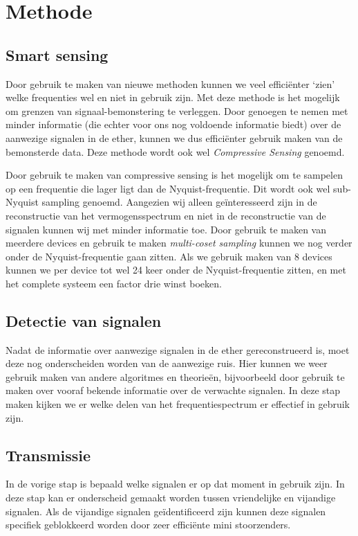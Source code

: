 \documentclass[oneside, a4paper, openany]{memoir}
\begin{document}
\section{Methode}
\subsection{Smart sensing}
Door gebruik te maken van nieuwe methoden kunnen we veel efficiënter `zien' welke frequenties wel en niet in gebruik zijn. Met deze methode is het mogelijk om grenzen van signaal-bemonstering te verleggen. Door genoegen te nemen met minder informatie (die echter voor ons nog voldoende informatie biedt) over de aanwezige signalen in de ether, kunnen we dus efficiënter gebruik maken van de bemonsterde data. Deze methode wordt ook wel \textit{Compressive Sensing} genoemd.

\begin{blockDetail}
Door gebruik te maken van compressive sensing is het mogelijk om te sampelen op een frequentie die lager ligt dan de Nyquist-frequentie. Dit wordt ook wel sub-Nyquist sampling genoemd. Aangezien wij alleen geïnteresseerd zijn in de reconstructie van het vermogensspectrum en niet in de reconstructie van de signalen kunnen wij met minder informatie toe. Door gebruik te maken van meerdere devices en gebruik te maken \textit{multi-coset sampling} kunnen we nog verder onder de Nyquist-frequentie gaan zitten. Als we gebruik maken van 8 devices kunnen we per device tot wel 24 keer onder de Nyquist-frequentie zitten, en met het complete systeem een factor drie winst boeken.\cite{ariananda2011multicoset}\cite{ariananda2012compressive}
\end{blockDetail}

\subsection{Detectie van signalen}
Nadat de informatie over aanwezige signalen in de ether gereconstrueerd is, moet deze nog onderscheiden worden van de aanwezige ruis. Hier kunnen we weer gebruik maken van andere algoritmes en theorieën, bijvoorbeeld door gebruik te maken over vooraf bekende informatie over de verwachte signalen. In deze stap maken kijken we er welke delen van het frequentiespectrum er effectief in gebruik zijn.

\subsection{Transmissie}
In de vorige stap is bepaald welke signalen er op dat moment in gebruik zijn. In deze stap kan er onderscheid gemaakt worden tussen vriendelijke en vijandige signalen. Als de vijandige signalen geïdentificeerd zijn kunnen deze signalen specifiek geblokkeerd worden door zeer efficiënte mini stoorzenders.
\end{document}
